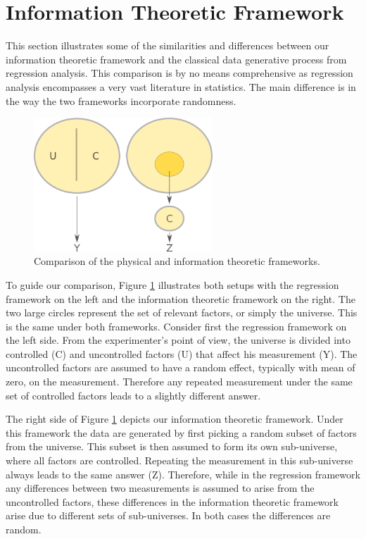 \documentclass[11pt,twoside]{article}
\begin{document}
\section{Information Theoretic Framework}
This section illustrates some of the similarities and differences between our information theoretic framework and the classical data generative process from regression analysis. This comparison is by no means comprehensive as regression analysis encompasses a very vast literature in statistics. The main difference is in the way the two frameworks incorporate randomness.

\begin{figure}[htbp]
   \centering
   \includegraphics[width = 0.6\textwidth]{regression} %
   \caption{Comparison of the physical and information theoretic frameworks.}
   \label{framework}
\end{figure}


To guide our comparison, Figure \ref{framework} illustrates both setups with the regression framework on the left and the information theoretic framework on the right. The two large circles represent the set of relevant factors, or simply the universe. This is the same under both frameworks. Consider first the regression framework on the left side. From the experimenter's point of view, the universe is divided into controlled (C) and uncontrolled factors (U) that affect his measurement (Y). The uncontrolled factors are assumed to have a random effect, typically with mean of zero, on the measurement. Therefore any repeated measurement under the same set of controlled factors leads to a slightly different answer.  


The right side of Figure \ref{framework} depicts our information theoretic framework. Under this framework the data are generated by first picking a random subset of factors from the universe. This subset is then assumed to form its own sub-universe, where all factors are controlled. Repeating the measurement in this sub-universe always leads to the same answer (Z). Therefore, while in the regression framework any differences between two measurements is assumed to arise from the uncontrolled factors, these differences in the information theoretic framework arise due to different sets of sub-universes. In both cases the differences are random. 
\end{document}
